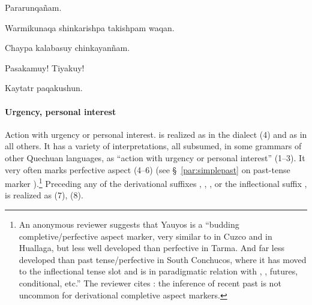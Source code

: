 %
{Pararunqa\~nam.}%
{}%
{}{}%

%
{Warmikunaqa shinkarishpa takishpam waqan.}%
{}%
%
{}{}

%
{Chaypa kalabasuy chinkayan\~nam.}%
{}%
{}{}%

%
{\textexclamdown{}Pasakamuy! \textexclamdown{}Tiyakuy!}%
{}%
{}{}%

%
{Kaytatr paqakushun.}%
{}%
{}{}%

\paragraph{Urgency, personal interest }\label{par:urgpers}
Action with urgency or personal interest.  is realized as  in the \CH{} dialect (4) and as  in all others. It has a variety of interpretations, all subsumed, in some grammars of other Quechuan languages, as ``action with urgency or personal interest'' (1--3). It very often marks perfective aspect (4--6) (see \S~\ref{par:simplepast} on past-tense marker ).\footnote{An anonymous reviewer suggests that Yauyos  is a ``budding completive/perfective aspect marker, very similar to  in Cuzco and in Huallaga, but less well developed than perfective  in Tarma. And far less developed than past tense/perfective  in South Conchucos, where it has moved to the inflectional tense slot and is in paradigmatic relation with , , futures, conditional, etc.'' The reviewer cites \citet{bybee1994}: the inference of recent past is not uncommon for derivational completive aspect markers.} Preceding any of the derivational suffixes , , ,  or the inflectional suffix ,  is realized as  (7), (8). 

